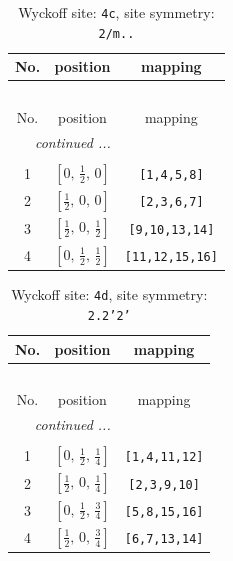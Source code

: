 \documentclass[fleqn,8pt]{jsarticle}
\begin{document}
\renewcommand{\arraystretch}{1.2}
\begin{longtable}{ccc}
\caption{Wyckoff site: {\tt 4c}, site symmetry: {\tt 2/m..}}
 \\
 \hline \hline
No. & position & mapping \\ \hline \endfirsthead

\multicolumn{2}{l}{\tablename\ \thetable{}} \\
 \hline \hline
No. & position & mapping \\ \hline \endhead

 \hline \hline
\multicolumn{2}{r}{\footnotesize\it continued ...} \\ \endfoot

 \hline \hline
\multicolumn{2}{r}{} \\ \endlastfoot

1 & $\left[ 0,\, \frac{1}{2},\, 0 \right]$ & {\tt [1,4,5,8]} \\ \hline
2 & $\left[ \frac{1}{2},\, 0,\, 0 \right]$ & {\tt [2,3,6,7]} \\ \hline
3 & $\left[ \frac{1}{2},\, 0,\, \frac{1}{2} \right]$ & {\tt [9,10,13,14]} \\ \hline
4 & $\left[ 0,\, \frac{1}{2},\, \frac{1}{2} \right]$ & {\tt [11,12,15,16]} \\
\end{longtable}
\renewcommand{\arraystretch}{1.2}
\begin{longtable}{ccc}
\caption{Wyckoff site: {\tt 4d}, site symmetry: {\tt 2.2'2'}}
 \\
 \hline \hline
No. & position & mapping \\ \hline \endfirsthead

\multicolumn{2}{l}{\tablename\ \thetable{}} \\
 \hline \hline
No. & position & mapping \\ \hline \endhead

 \hline \hline
\multicolumn{2}{r}{\footnotesize\it continued ...} \\ \endfoot

 \hline \hline
\multicolumn{2}{r}{} \\ \endlastfoot

1 & $\left[ 0,\, \frac{1}{2},\, \frac{1}{4} \right]$ & {\tt [1,4,11,12]} \\ \hline
2 & $\left[ \frac{1}{2},\, 0,\, \frac{1}{4} \right]$ & {\tt [2,3,9,10]} \\ \hline
3 & $\left[ 0,\, \frac{1}{2},\, \frac{3}{4} \right]$ & {\tt [5,8,15,16]} \\ \hline
4 & $\left[ \frac{1}{2},\, 0,\, \frac{3}{4} \right]$ & {\tt [6,7,13,14]} \\
\end{longtable}
\end{document}
